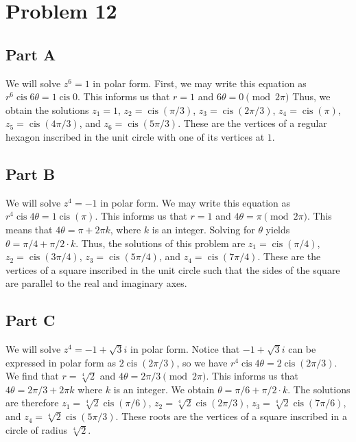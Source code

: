 \documentclass[12pt]{article}
\DeclareMathOperator{\cis}{cis}
\begin{document}
\section*{Problem 12}
\subsection*{Part A}
We will solve $z^6 = 1$ in polar form. First, we may write this equation as $r^6 \cis 6\theta = 1 \cis 0$. This informs us that $r = 1$ and $6\theta=  0 \pmod{2\pi}$ Thus, we obtain the solutions $z_1 = 1$, $z_2 = \cis(\pi/3)$, $z_3 = \cis(2\pi/3)$, $z_4 = \cis(\pi)$, $z_5 = \cis(4\pi/3)$, and $z_6 = \cis(5\pi/3)$. These are the vertices of a regular hexagon inscribed in the unit circle with one of its vertices at $1$.
\subsection*{Part B}
We will solve $z^4 = -1$ in polar form. We may write this equation as $r^4 \cis 4\theta = 1 \cis (\pi)$. This informs us that $r = 1$ and $4\theta = \pi \pmod{2\pi}$. This means that $4\theta = \pi + 2\pi k$, where $k$ is an integer. Solving for $\theta$ yields $\theta = \pi/4 + \pi/2 \cdot k$. Thus, the solutions of this problem are $z_1 = \cis(\pi/4)$, $z_2 = \cis(3\pi/4)$, $z_3 = \cis(5\pi/4)$, and $z_4 = \cis(7\pi/4)$. These are the vertices of a square inscribed in the unit circle such that the sides of the square are parallel to the real and imaginary axes.
\subsection*{Part C}
We will solve $z^4 = -1 + \sqrt{3}i$ in polar form. Notice that $-1+\sqrt{3}i$ can be expressed in polar form as $2\cis (2\pi/3) $, so we have $r^4 \cis 4\theta = 2\cis (2\pi/3)$. We find that $r =  \sqrt[4]{2}$ and $4\theta = 2\pi/3 \pmod{2\pi}$. This informs us that $4\theta = 2\pi/3 + 2\pi k$ where $k$ is an integer. We obtain $\theta = \pi/6 + \pi/2 \cdot k$. The solutions are therefore $z_1 = \sqrt[4]{2} \cis(\pi/6)$, $z_2 = \sqrt[4]{2} \cis(2\pi/3)$, $z_3 = \sqrt[4]{2} \cis (7\pi/6)$, and $z_4=  \sqrt[4]{2}\cis(5\pi/3)$. These roots are the vertices of a square inscribed in a circle of radius $\sqrt[4]{2}$.
\end{document}
